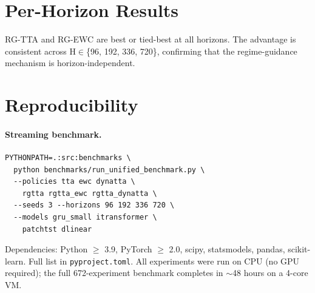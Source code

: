 \documentclass[journal]{IEEEtran}
\begin{document}
\section{Per-Horizon Results}
\label{app:horizons}

\begin{table}[t]
\centering
\caption{Average MSE by horizon and policy (all 14 datasets, 4 models, 3 seeds).}
\label{tab:horizons}
\small
{}%
\end{table}

RG-TTA and RG-EWC are best or tied-best at all horizons. The advantage is consistent across H$\in$\{96, 192, 336, 720\}, confirming that the regime-guidance mechanism is horizon-independent.

\section{Reproducibility}
\label{app:reproduce}

\paragraph{Streaming benchmark.}
{\footnotesize
\begin{verbatim}
PYTHONPATH=.:src:benchmarks \
  python benchmarks/run_unified_benchmark.py \
  --policies tta ewc dynatta \
    rgtta rgtta_ewc rgtta_dynatta \
  --seeds 3 --horizons 96 192 336 720 \
  --models gru_small itransformer \
    patchtst dlinear
\end{verbatim}
}

Dependencies: Python $\geq$ 3.9, PyTorch $\geq$ 2.0, scipy, statsmodels, pandas, scikit-learn. Full list in \texttt{pyproject.toml}. All experiments were run on CPU (no GPU required); the full 672-experiment benchmark completes in $\sim$48 hours on a 4-core VM.
\end{document}
